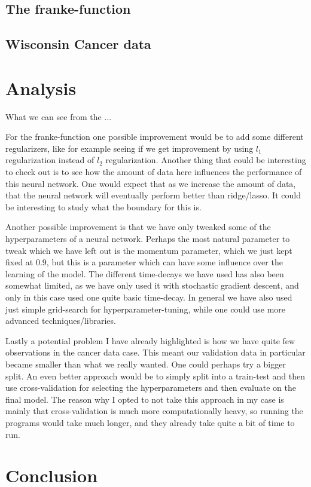 \documentclass{article}
\begin{document}
\subsection{The franke-function}

\subsection{Wisconsin Cancer data}

\section{Analysis}
What we can see from the ...

For the franke-function one possible improvement would be to add some different
regularizers, like for example seeing if we get improvement by using $l_1$
regularization instead of $l_2$ regularization. Another thing that could be
interesting to check out is to see how the amount of data here influences the
performance of this neural network.  One would expect that as we increase the
amount of data, that the neural network will eventually perform better than
ridge/lasso. It could be interesting to study what the boundary for this is.

Another possible improvement is that we have only tweaked some of the
hyperparameters of a neural network. Perhaps the most natural parameter to tweak
which we have left out is the momentum parameter, which we just kept fixed at
$0.9$, but this is a parameter which can have some influence over the learning
of the model. The different time-decays we have used has also been somewhat
limited, as we have only used it with stochastic gradient descent, and only in
this case used one quite basic time-decay. In general we have also used just
simple grid-search for hyperparameter-tuning, while one could use more advanced
techniques/libraries.

Lastly a potential problem I have already highlighted is how we have quite few
observations in the cancer data case. This meant our validation data in
particular became smaller than what we really wanted. One could perhaps try a
bigger split. An even better approach would be to simply split into a train-test
and then use cross-validation for selecting the hyperparameters and then
evaluate on the final model. The reason why I opted to not take this approach in
my case is mainly that cross-validation is much more computationally heavy, so
running the programs would take much longer, and they already take quite a bit
of time to run.

\section{Conclusion}


\end{document}
